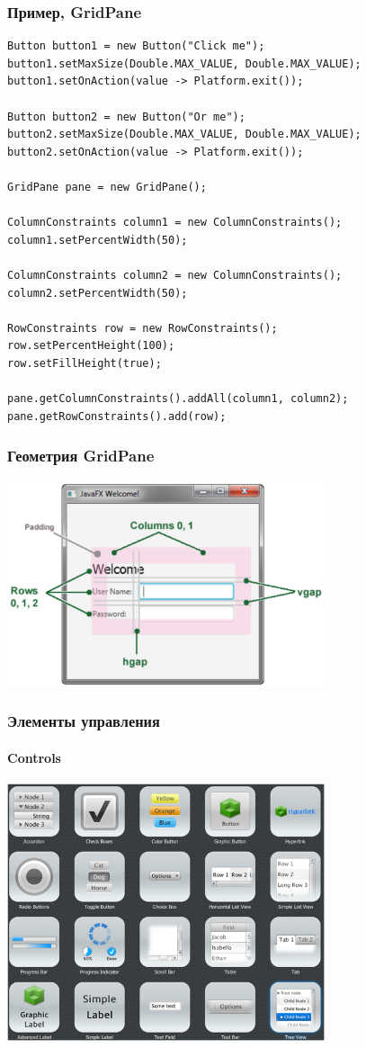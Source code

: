 \documentclass[xetex,mathserif,serif]{beamer}
\begin{document}
	\begin{frame}[fragile]
		\frametitle{Пример, GridPane}
		\begin{scriptsize}
			\begin{verbatim}
Button button1 = new Button("Click me");
button1.setMaxSize(Double.MAX_VALUE, Double.MAX_VALUE);
button1.setOnAction(value -> Platform.exit());

Button button2 = new Button("Or me");
button2.setMaxSize(Double.MAX_VALUE, Double.MAX_VALUE);
button2.setOnAction(value -> Platform.exit());

GridPane pane = new GridPane();

ColumnConstraints column1 = new ColumnConstraints();
column1.setPercentWidth(50);

ColumnConstraints column2 = new ColumnConstraints();
column2.setPercentWidth(50);

RowConstraints row = new RowConstraints();
row.setPercentHeight(100);
row.setFillHeight(true);

pane.getColumnConstraints().addAll(column1, column2);
pane.getRowConstraints().add(row);
			\end{verbatim}
		\end{scriptsize}
	\end{frame}

	\begin{frame}
		\frametitle{Геометрия GridPane}
		\begin{center}
			\includegraphics[width=0.7\textwidth]{gridGeometry.png}
		\end{center}
	\end{frame}

	\begin{frame}
		\frametitle{Элементы управления}
		\framesubtitle{Controls}
		\begin{center}
			\includegraphics[width=0.7\textwidth]{javaFxControls.png}
		\end{center}
	\end{frame}
\end{document}
